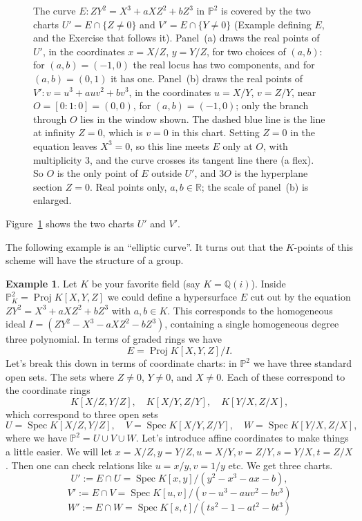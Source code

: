 \documentclass[12pt]{article}
\numberwithin{equation}{section}
\theoremstyle{definition}
\newtheorem{example}[theorem]{Example}
\theoremstyle{remark}
\newcommand{\QQ}{\mathbb{Q}}
\newcommand{\RR}{\mathbb{R}}
\newcommand{\PP}{\mathbb{P}}
\newcommand{\Spec}{\operatorname{Spec}}
\newcommand{\Proj}{\operatorname{Proj}}
\begin{document}
\begin{figure}[H]
\centering

\caption{The curve $E\colon ZY^2=X^3+aXZ^2+bZ^3$ in $\PP^2$ is covered by the two charts $U'=E\cap\{Z\neq0\}$ and $V'=E\cap\{Y\neq0\}$ (Example defining $E$, and the Exercise that follows it). Panel~(a) draws the real points of $U'$, in the coordinates $x=X/Z$, $y=Y/Z$, for two choices of $(a,b)$: for $(a,b)=(-1,0)$ the real locus has two components, and for $(a,b)=(0,1)$ it has one. Panel~(b) draws the real points of $V'\colon v=u^3+auv^2+bv^3$, in the coordinates $u=X/Y$, $v=Z/Y$, near $O=[0{:}1{:}0]=(0,0)$, for $(a,b)=(-1,0)$; only the branch through $O$ lies in the window shown. The dashed blue line is the line at infinity $Z=0$, which is $v=0$ in this chart. Setting $Z=0$ in the equation leaves $X^3=0$, so this line meets $E$ only at $O$, with multiplicity $3$, and the curve crosses its tangent line there (a flex). So $O$ is the only point of $E$ outside $U'$, and $3O$ is the hyperplane section $Z=0$. Real points only, $a,b\in\RR$; the scale of panel~(b) is enlarged.}\label{fig:weierstrass-charts}
\end{figure}
Figure~\ref{fig:weierstrass-charts} shows the two charts $U'$ and $V'$.

The following example is an ``elliptic curve''. 
It turns out that the $K$-points of this scheme will have the structure of a group.
\begin{example}
	Let $K$ be your favorite field (say $K=\QQ(i)$).
	Inside $\PP^2_{K} = \Proj K[X,Y,Z]$ we could define a hypersurface $E$  cut out by the equation $ZY^2=X^3+aXZ^2+bZ^3$ with $a,b\in K$.
	This corresponds to the homogeneous ideal $I = (ZY^2-X^3-aXZ^2-bZ^3)$, containing a single homogeneous degree three polynomial. 
	In terms of graded rings we have 
	 $$ E = \Proj K[X,Y,Z]/I. $$
	Let's break this down in terms of coordinate charts: in $\PP^2$ we have three standard open sets. 
	The sets where $Z\neq 0$, $Y\neq 0$, and $X\neq 0$. 
	Each of these correspond to the coordinate rings 
	 $$ K[X/Z,Y/Z], \quad K[X/Y,Z/Y], \quad K[Y/X,Z/X],$$
	which correspond to three open sets 
	 $$ U=\Spec K[X/Z,Y/Z], \quad V = \Spec K[X/Y,Z/Y], \quad W = \Spec K[Y/X,Z/X],$$
	where we have $\PP^2 = U \cup V \cup W$. 
	Let's introduce affine coordinates to make things a little easier. 
	We will let $x = X/Z, y=Y/Z, u = X/Y, v=Z/Y, s=Y/X, t=Z/X$. 
	Then one can check relations like $u=x/y, v = 1/y$ etc.
	We get three charts.
	 $$U':=E\cap U = \Spec K[x,y]/(y^2-x^3-ax-b), $$
	 $$V':=E \cap V = \Spec K[u,v]/(v-u^3-auv^2-bv^3)$$
	 $$W':=E \cap W = \Spec K[s,t]/(ts^2-1-at^2-bt^3)$$
\end{example}
\end{document}
